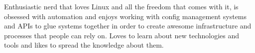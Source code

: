 

\begin{cvparagraph}

Enthusiastic nerd that loves Linux and all the freedom that comes with it, is obsessed with
  automation and enjoys working with config management systems and APIs to glue systems together in
  order to create awesome infrastructure and processes that people can rely on. Loves to learn about
  new technologies and tools and likes to spread the knowledge about them.
\end{cvparagraph}
